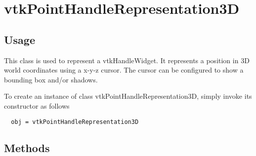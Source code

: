 \section{vtkPointHandleRepresentation3D}

\subsection{Usage}

 This class is used to represent a vtkHandleWidget. It represents a position
 in 3D world coordinates using a x-y-z cursor. The cursor can be configured to
 show a bounding box and/or shadows.

To create an instance of class vtkPointHandleRepresentation3D, simply
invoke its constructor as follows
\begin{verbatim}
  obj = vtkPointHandleRepresentation3D
\end{verbatim}
\subsection{Methods}

